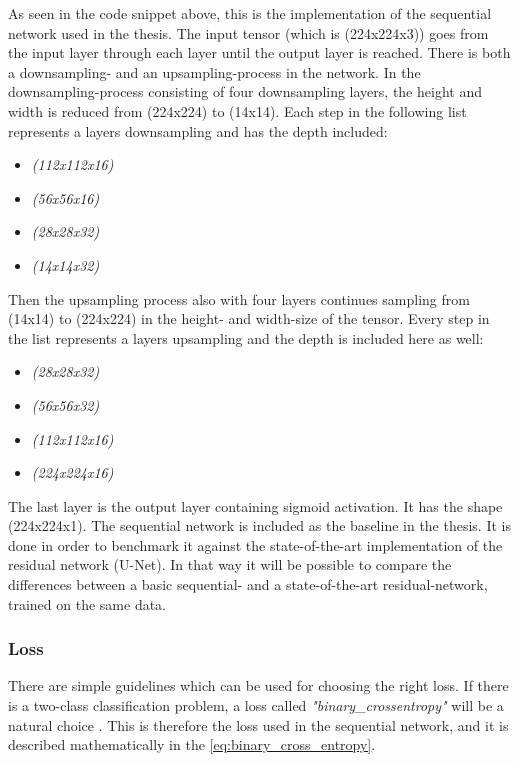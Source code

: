 \documentclass[USenglish]{ifimaster}  %
\begin{document}
As seen in the code snippet above, this is the implementation of the sequential network used in the thesis. The input tensor (which is (224x224x3)) goes from the input layer through each layer until the output layer is reached. 
There is both a downsampling- and an upsampling-process in the network. In the downsampling-process consisting of four downsampling layers, the height and width is reduced from (224x224) to (14x14). Each step in the following list represents a layers downsampling and has the depth included:
\begin{itemize}
    \item \textit{(112x112x16)}
    \item \textit{(56x56x16)}
    \item \textit{(28x28x32)}
    \item \textit{(14x14x32)}
\end{itemize}
Then the upsampling process also with four layers continues sampling from (14x14) to (224x224) in the height- and width-size of the tensor. Every step in the list represents a layers upsampling and the depth is included here as well:
\begin{itemize}
    \item \textit{(28x28x32)}
    \item \textit{(56x56x32)}
    \item \textit{(112x112x16)}
    \item \textit{(224x224x16)}
\end{itemize}
The last layer is the output layer containing sigmoid activation. It has the shape (224x224x1).
\newline
\newline
The sequential network is included as the baseline in the thesis. It is done in order to benchmark it against the state-of-the-art implementation of the residual network (U-Net). In that way it will be possible to compare the differences between a basic sequential- and a state-of-the-art residual-network, trained on the same data.
\subsubsection{Loss}
There are simple guidelines which can be used for choosing the right loss. If there is a two-class classification problem, a loss called \textit{"binary\_crossentropy"} will be a natural choice \cite{Francois_Deep_learning_with_python}. This is therefore the loss used in the sequential network, and it is described mathematically in the \cref{eq:binary_cross_entropy}.
\end{document}
